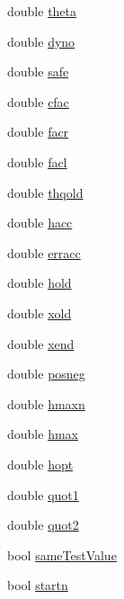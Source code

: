 \begin{DoxyCompactItemize}
\item 
double \hyperlink{classodes_1_1Radau5cc_af9475ed436133a308c22edfda6892988}{theta}
\item 
double \hyperlink{classodes_1_1Radau5cc_a36cb3bec1d0c8e1f6ea23eec088d5fa7}{dyno}
\item 
double \hyperlink{classodes_1_1Radau5cc_a8809fb6e400f5eaa32331a2e463f9cdb}{safe}
\item 
double \hyperlink{classodes_1_1Radau5cc_afa383ebf8974ba3aac8841b6a4b43afa}{cfac}
\item 
double \hyperlink{classodes_1_1Radau5cc_a2bda7f90bc9aabbc2d98ff14daeaa491}{facr}
\item 
double \hyperlink{classodes_1_1Radau5cc_a13fe7121c4b03dca25bfb7b362032182}{facl}
\item 
double \hyperlink{classodes_1_1Radau5cc_adda256e4a50fe0b527b9a389ba06a9c4}{thqold}
\item 
double \hyperlink{classodes_1_1Radau5cc_a868b61b5db9d458fd554f004ca366a52}{hacc}
\item 
double \hyperlink{classodes_1_1Radau5cc_a54eb4159056970d5c2c3ea85e79154bb}{erracc}
\item 
double \hyperlink{classodes_1_1Radau5cc_a042b65cfeb0816edd1c2218ea9fe56c9}{hold}
\item 
double \hyperlink{classodes_1_1Radau5cc_a46e492dffaba4f529881e74bda794bbd}{xold}
\item 
double \hyperlink{classodes_1_1Radau5cc_ac6e95e640106e403c36b260fa97d1bb6}{xend}
\item 
double \hyperlink{classodes_1_1Radau5cc_a4acabf9c37c68c6b50dd32c6a12724a6}{posneg}
\item 
double \hyperlink{classodes_1_1Radau5cc_aa3b6b73884b0a085cf7f2b701940658e}{hmaxn}
\item 
double \hyperlink{classodes_1_1Radau5cc_a73d88dc2c07d7e200a1c03dae8caa7f4}{hmax}
\item 
double \hyperlink{classodes_1_1Radau5cc_a9c91cdeb773885e6b7cf3699142c80eb}{hopt}
\item 
double \hyperlink{classodes_1_1Radau5cc_a0c3cc3ba99f9aca257eab5b3a1f4cb43}{quot1}
\item 
double \hyperlink{classodes_1_1Radau5cc_a66d2ae6f5ecac2c7983fe54293a6cc30}{quot2}
\item 
bool \hyperlink{classodes_1_1Radau5cc_acab8ee5b4ea97c71a0f34bf41f145a58}{same\+Test\+Value}
\item 
bool \hyperlink{classodes_1_1Radau5cc_a04284948029a635e8d0d4ea79e15c5ea}{startn}
\item 

\end{DoxyCompactItemize}
